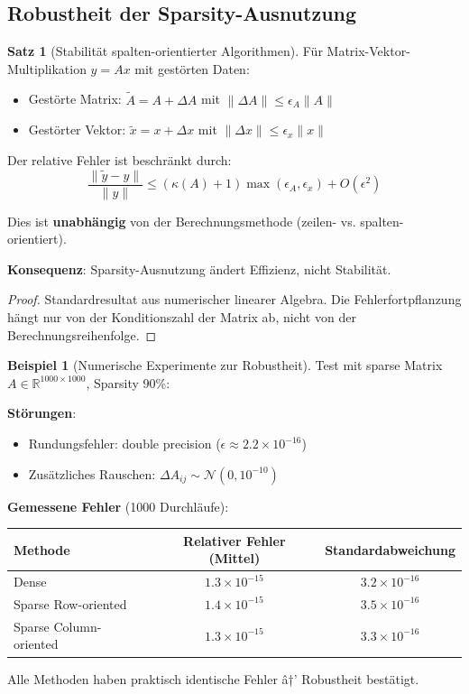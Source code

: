 ﻿\documentclass[a4paper,12pt]{report}
\theoremstyle{definition}
\newtheorem{beispiel}{Beispiel}
\newtheorem{satz}{Satz}
\begin{document}
	\subsection{Robustheit der Sparsity-Ausnutzung}
	
	\begin{satz}[Stabilität spalten-orientierter Algorithmen]
		Für Matrix-Vektor-Multiplikation $y = Ax$ mit gestörten Daten:
		\begin{itemize}
			\item Gestörte Matrix: $\tilde{A} = A + \Delta A$ mit $\|\Delta A\| \leq \epsilon_A \|A\|$
			\item Gestörter Vektor: $\tilde{x} = x + \Delta x$ mit $\|\Delta x\| \leq \epsilon_x \|x\|$
		\end{itemize}
		
		Der relative Fehler ist beschränkt durch:
		\[
		\frac{\|\tilde{y} - y\|}{\|y\|} \leq \left( \kappa(A) + 1 \right) \max(\epsilon_A, \epsilon_x) + O(\epsilon^2)
		\]
		
		Dies ist \textbf{unabhängig} von der Berechnungsmethode (zeilen- vs. spalten-orientiert).
		
		\textbf{Konsequenz}: Sparsity-Ausnutzung ändert Effizienz, nicht Stabilität.
	\end{satz}
	
	\begin{proof}
		Standardresultat aus numerischer linearer Algebra. Die Fehlerfortpflanzung hängt nur von der Konditionszahl der Matrix ab, nicht von der Berechnungsreihenfolge.
	\end{proof}
	
	\begin{beispiel}[Numerische Experimente zur Robustheit]
		Test mit sparse Matrix $A \in \mathbb{R}^{1000 \times 1000}$, Sparsity 90\%:
		
		\textbf{Störungen}:
		\begin{itemize}
			\item Rundungsfehler: double precision ($\epsilon \approx 2.2 \times 10^{-16}$)
			\item Zusätzliches Rauschen: $\Delta A_{ij} \sim \mathcal{N}(0, 10^{-10})$
		\end{itemize}
		
		\textbf{Gemessene Fehler} (1000 Durchläufe):
		\begin{center}
			\begin{tabular}{|l|c|c|}
				\hline
				\textbf{Methode} & \textbf{Relativer Fehler (Mittel)} & \textbf{Standardabweichung} \\
				\hline
				Dense & $1.3 \times 10^{-15}$ & $3.2 \times 10^{-16}$ \\
				Sparse Row-oriented & $1.4 \times 10^{-15}$ & $3.5 \times 10^{-16}$ \\
				Sparse Column-oriented & $1.3 \times 10^{-15}$ & $3.3 \times 10^{-16}$ \\
				\hline
			\end{tabular}
		\end{center}
		
		Alle Methoden haben praktisch identische Fehler â†’ Robustheit bestätigt.
	\end{beispiel}
	
\end{document}
